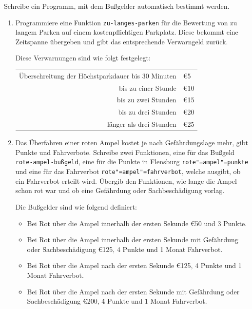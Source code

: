 \begin{aufgabe}
  Schreibe ein Programm, mit dem Bußgelder
  automatisch bestimmt werden.
  
  \begin{enumerate}
  \item Programmiere eine Funktion \texttt{zu-langes-parken}
    für die Bewertung von zu langem Parken auf einem kostenpflichtigen
    Parkplatz. Diese bekommt eine Zeitspanne übergeben und gibt das 
    entsprechende Verwarngeld zurück.
    
    Diese Verwarnungen sind wie folgt festgelegt:
    \begin{flushleft}
      \begin{tabular}{rl}
    Überschreitung der Höchstparkdauer bis 30 Minuten & \euro{5}\\
    bis zu einer Stunde & \euro{10}\\
    bis zu zwei Stunden & \euro{15}\\
    bis zu drei Stunden & \euro{20}\\
    länger als drei Stunden &  \euro{25}
      \end{tabular}
    \end{flushleft}
    
  \item Das Überfahren einer roten Ampel kostet je nach
    Gefährdungslage mehr, gibt Punkte und Fahrverbote. Schreibe
    zwei Funktionen, eine für das Bußgeld \texttt{rote-ampel-bußgeld}, 
    eine für die Punkte in Flensburg \texttt{rote"=ampel"=punkte} 
    und eine für das Fahrverbot \texttt{rote"=ampel"=fahrverbot}, 
    welche ausgibt, ob ein Fahrverbot erteilt wird. Übergib
    den Funktionen, wie lange die Ampel schon rot war und ob eine
    Gefährdung oder Sachbeschädigung vorlag.
    
    Die Bußgelder sind wie folgend definiert:
    \begin{itemize}
    \item Bei Rot über die Ampel innerhalb der ersten Sekunde			
      \euro{50} und 3 Punkte.
    \item Bei Rot über die Ampel innerhalb der ersten Sekunde mit
      Gefährdung oder Sachbeschädigung \euro{125}, 4 		
      Punkte und 1 Monat Fahrverbot.
    \item Bei Rot über die Ampel nach der ersten Sekunde \euro{125},
      4 Punkte und 1 Monat Fahrverbot.
    \item Bei Rot über die Ampel nach der ersten Sekunde mit
      Gefährdung oder Sachbeschädigung \euro{200}, 4
      Punkte und 1 Monat Fahrverbot.
    \end{itemize}
    
    
  \end{enumerate}
\end{aufgabe}


